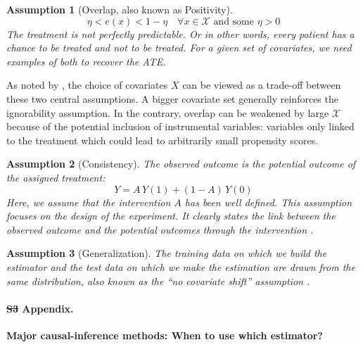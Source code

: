 \documentclass[10pt,letterpaper]{article}
\newtheorem{assumption}{Assumption}
\providecommand{\DIFaddtex}[1]{{\protect\color{blue}\uwave{#1}}} %
\providecommand{\DIFdeltex}[1]{{\protect\color{red}\sout{#1}}}                      %
\providecommand{\DIFaddbegin}{} %
\providecommand{\DIFaddend}{} %
\providecommand{\DIFdelbegin}{} %
\providecommand{\DIFdelend}{} %
\providecommand{\DIFadd}[1]{\texorpdfstring{\DIFaddtex{#1}}{#1}} %
\providecommand{\DIFdel}[1]{\texorpdfstring{\DIFdeltex{#1}}{}} %
\newcommand{\DIFscaledelfig}{0.5}
\newlength{\DIFdelgraphicswidth} %
\newlength{\DIFdelgraphicsheight} %
\newcommand{\DIFaddincludegraphics}[2][]{{\color{blue}\fbox{\DIFOincludegraphics[#1]{#2}}}} %
\newcommand{\DIFdelincludegraphics}[2][]{%
\sbox{\DIFdelgraphicsbox}{\DIFOincludegraphics[#1]{#2}}%
\settoboxwidth{\DIFdelgraphicswidth}{\DIFdelgraphicsbox} %
\settoboxtotalheight{\DIFdelgraphicsheight}{\DIFdelgraphicsbox} %
\scalebox{\DIFscaledelfig}{%
\parbox[b]{\DIFdelgraphicswidth}{\usebox{\DIFdelgraphicsbox}\\[-\baselineskip] \rule{\DIFdelgraphicswidth}{0em}}\llap{\resizebox{\DIFdelgraphicswidth}{\DIFdelgraphicsheight}{%
\setlength{\unitlength}{\DIFdelgraphicswidth}%
\begin{picture}(1,1)%
\thicklines\linethickness{2pt} %
{\color[rgb]{1,0,0}\put(0,0){\framebox(1,1){}}}%
{\color[rgb]{1,0,0}\put(0,0){\line( 1,1){1}}}%
{\color[rgb]{1,0,0}\put(0,1){\line(1,-1){1}}}%
\end{picture}%
}\hspace*{3pt}}} %
} %
\DeclareRobustCommand{\DIFaddbegin}{\DIFOaddbegin \let\includegraphics\DIFaddincludegraphics} %
\DeclareRobustCommand{\DIFaddend}{\DIFOaddend \let\includegraphics\DIFOincludegraphics} %
\DeclareRobustCommand{\DIFdelbegin}{\DIFOdelbegin \let\includegraphics\DIFdelincludegraphics} %
\DeclareRobustCommand{\DIFdelend}{\DIFOaddend \let\includegraphics\DIFOincludegraphics} %
\begin{document}
\DIFaddend \begin{assumption}[Overlap, also known as Positivity]\label{assumption:overlap}
  \begin{equation}\label{eq:overlap}
    \eta < e(x) < 1 - \eta \quad \forall x \in \mathcal{X} \text{ and some }   \eta > 0
  \end{equation}
  The treatment is not perfectly predictable. Or in other words, every
  patient has a chance to be treated and not to be treated. For a given set of
  covariates, we need examples of both to recover the ATE.
\end{assumption}

As noted by \cite{damour2020overlap}, the choice of covariates $X$ can
be viewed as a trade-off between these two central assumptions. A bigger
covariate set generally reinforces the ignorability assumption. In the
contrary, overlap can be weakened by large $\mathcal{X}$ because of the
potential inclusion of instrumental variables: variables only linked to the treatment which
could lead to arbitrarily small propensity scores.



\begin{assumption}[Consistency]\label{assumption:consistency} The observed
  outcome is the potential outcome of the assigned treatment:
  \begin{equation}\label{eq:consistancy}
    Y = A \, Y(1) + (1-A) \, Y(0)
  \end{equation}
  Here, we assume that the intervention $A$ has been well defined. This
  assumption focuses on the design of the experiment. It clearly states the link
  between the observed outcome and the potential outcomes through the
  intervention \cite{hernan2020causal}.
\end{assumption}

\begin{assumption}[Generalization]\label{assumption:generalization} The training
  data on which we build the estimator and the test data on which we make the
  estimation are drawn from the same distribution, also known as
  the ``no covariate shift'' assumption \cite{jesson2020identifying}.
\end{assumption}
\clearpage



\paragraph*{\DIFdelbegin \DIFdel{S3 }\DIFdelend \DIFaddbegin \DIFadd{S2 }\DIFaddend Appendix.}
\label{apd:causal_estimators}
{\bf Major causal-inference methods: When to use which estimator?}
\end{document}
